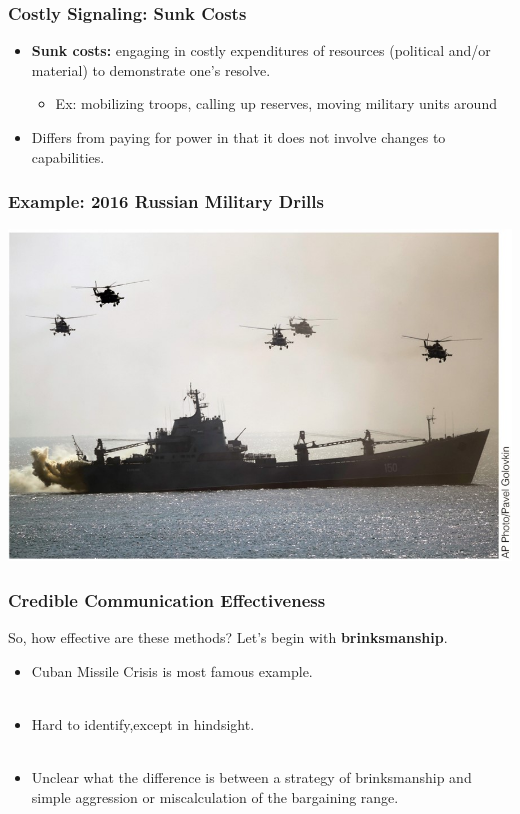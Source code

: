 \documentclass{beamer}
\begin{document}
\begin{frame} 
	\frametitle{\LARGE{Costly Signaling: Sunk Costs}}
	\begin{itemize}
		\item \textbf{Sunk costs:} engaging in costly expenditures of resources (political and/or material) to demonstrate one's resolve. \pause
		\begin{itemize}
			\item Ex: mobilizing troops, calling up reserves, moving military units around \pause
		\end{itemize}
		\item Differs from paying for power in that it does not involve changes to capabilities.
	\end{itemize}
\end{frame}


\begin{frame}
	\frametitle{\LARGE{Example: 2016 Russian Military Drills}}
	\centering
	\includegraphics[width=\textwidth,height=0.8\textheight,keepaspectratio]{Russiadrill.jpg}
\end{frame}

\begin{frame} 
	\frametitle{\LARGE{Credible Communication Effectiveness}}
So, how effective are these methods? Let's begin with \textbf{brinksmanship}. \pause
	\begin{itemize}
		\item Cuban Missile Crisis is most famous example. \pause
		\\~\\
		\item Hard to identify,except in hindsight. \pause
		\\~\\
		\item Unclear what the difference is between a strategy of brinksmanship and simple aggression or miscalculation of the bargaining range.
	\end{itemize}
\end{frame}
\end{document}
